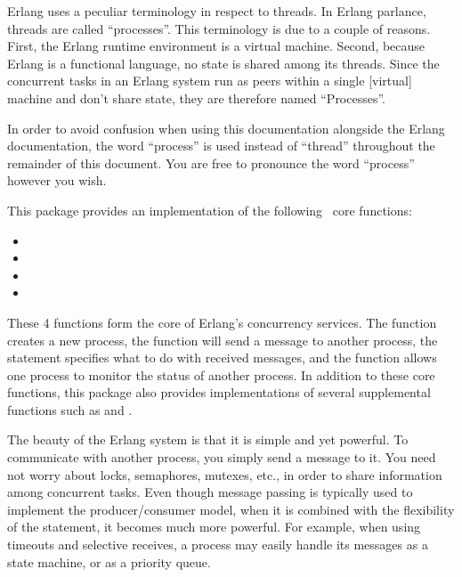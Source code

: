 \documentclass{howto}
\newcommand{\Erlang}{\ulink{Erlang}{http://www.erlang.org/}}
\begin{document}
\begin{notice}[note]
Erlang uses a peculiar terminology in respect to threads. In Erlang parlance,
threads are called ``processes''. This terminology is due to a couple of
reasons. First, the Erlang runtime environment is a virtual machine. Second,
because Erlang is a functional language, no state is shared among its threads.
Since the concurrent tasks in an Erlang system run as peers within a single
[virtual] machine and don't share state, they are therefore named ``Processes''.

In order to avoid confusion when using this documentation alongside the Erlang
documentation, the word ``process'' is used instead of ``thread'' throughout the
remainder of this document. You are free to pronounce the word ``process''
however you wish.
\end{notice}

This package provides an implementation of the following \Erlang\ core
functions:
\begin{itemize}
	\item {}
	\item {}
	\item {}
	\item {}
\end{itemize}

These 4 functions form the core of Erlang's concurrency services. The
 function creates a new process, the 
function will send a message to another process, the  statement
specifies what to do with received messages, and the  function
allows one process to monitor the status of another process. In addition to
these core functions, this package also provides implementations of several
supplemental functions such as  and .

The beauty of the Erlang system is that it is simple and yet powerful.
To communicate with another process, you simply send a message to it.
You need not worry about locks, semaphores, mutexes, etc., in order to
share information among concurrent tasks. Even though message passing is
typically used to implement the producer/consumer model, when it is combined
with the flexibility of the  statement, it becomes much more
powerful. For example, when using timeouts and selective receives, a process
may easily handle its messages as a state machine, or as a priority queue.
\end{document}
